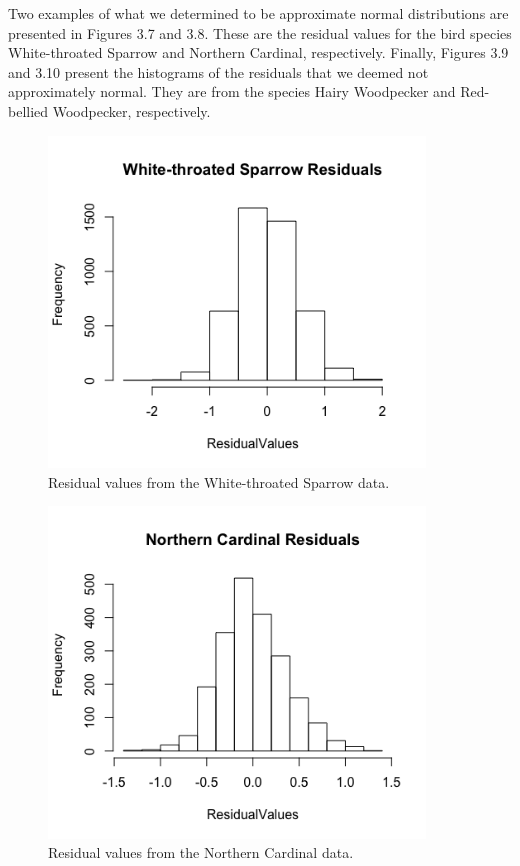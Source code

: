 Two examples of what we determined to be approximate normal distributions are presented in Figures 3.7 and 3.8. These are the residual values for the bird species White-throated Sparrow and Northern Cardinal, respectively. Finally, Figures 3.9 and 3.10 present the histograms of the residuals that we deemed not approximately normal. They are from the species Hairy Woodpecker and Red-bellied Woodpecker, respectively. 

\begin{figure}[h]
\centering
\includegraphics[width=10cm]{figures/WhiteSpResid.png}
\caption{Residual values from the White-throated Sparrow data.}
\end{figure}

\begin{figure}[h]
\centering
\includegraphics[width=10cm]{figures/NorthCardResid.png}
\caption{Residual values from the Northern Cardinal data.}
\end{figure}

